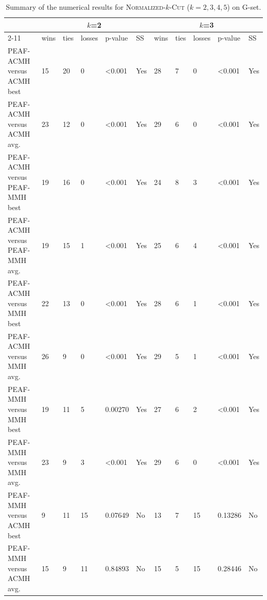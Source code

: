 \documentclass[12pt, a4paper]{article}%
\renewcommand{\arraystretch}{1.3}
\numberwithin{equation}{section}
\theoremstyle{plain}
\begin{document}
			
			{
				\scriptsize
				\setlength{\tabcolsep}{10pt}
				\renewcommand{\arraystretch}{1.6}
				\begin{landscape}
					\begin{longtable}{|l|lllll|lllll|}
						\caption[Summary for \textsc{Normalized}-$k$-\textsc{Cut}]{Summary of the numerical results for \textsc{Normalized}-$k$-\textsc{Cut} ($k=2,3,4,5$) on G-set.}
						\label{tab::normalized-summary}\\
						\hline
						\multicolumn{1}{|c|}{\multirow{2}{*}{}} & \multicolumn{5}{c|}{$k$=2}                    & \multicolumn{5}{c|}{$k$=3}                    \\ \cline{2-11} 
						\multicolumn{1}{|c|}{}                  & wins & ties & losses & p-value          & SS  & wins & ties & losses & p-value          & SS  \\ \hline
						PEAF-ACMH versus ACMH best             & 15   & 20   & 0      & \textless{}0.001 & Yes & 28   & 7    & 0      & \textless{}0.001 & Yes \\
						PEAF-ACMH versus ACMH avg.             & 23   & 12   & 0      & \textless{}0.001 & Yes & 29   & 6    & 0      & \textless{}0.001 & Yes \\
						PEAF-ACMH versus PEAF-MMH best           & 19   & 16   & 0      & \textless{}0.001 & Yes & 24   & 8    & 3      & \textless{}0.001 & Yes \\
						PEAF-ACMH versus PEAF-MMH avg.           & 19   & 15   & 1      & \textless{}0.001 & Yes & 25   & 6    & 4      & \textless{}0.001 & Yes \\
						PEAF-ACMH versus MMH best               & 22   & 13   & 0      & \textless{}0.001 & Yes & 28   & 6    & 1      & \textless{}0.001 & Yes \\
						PEAF-ACMH versus MMH avg.               & 26   & 9    & 0      & \textless{}0.001 & Yes & 29   & 5    & 1      & \textless{}0.001 & Yes \\
						PEAF-MMH versus MMH best                 & 19   & 11   & 5      & 0.00270          & Yes & 27   & 6    & 2      & \textless{}0.001 & Yes \\
						PEAF-MMH versus MMH avg.                 & 23   & 9    & 3      & \textless{}0.001 & Yes & 29   & 6    & 0      & \textless{}0.001 & Yes \\
						PEAF-MMH versus ACMH best               & 9    & 11   & 15     & 0.07649          & No  & 13   & 7    & 15     & 0.13286          & No  \\
						PEAF-MMH versus ACMH avg.               & 15   & 9    & 11     & 0.84893          & No  & 15   & 5    & 15     & 0.28446          & No  \\

\end{longtable}
\end{landscape}}
\end{document}
